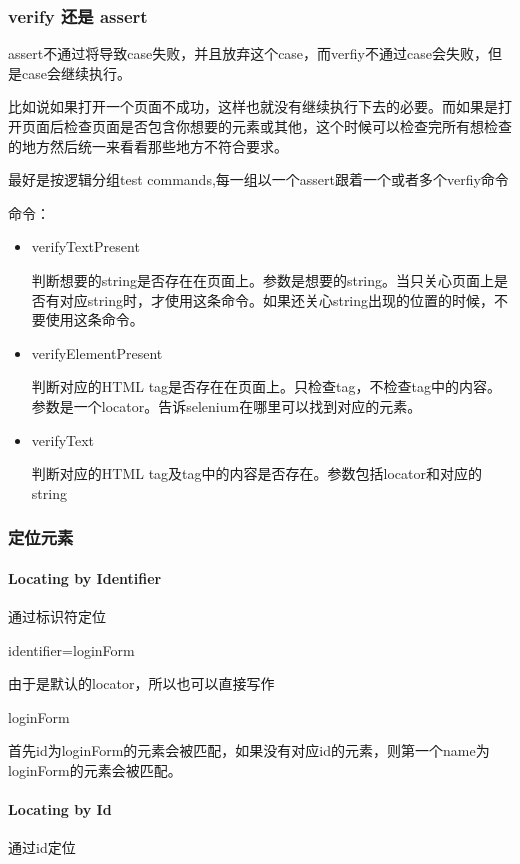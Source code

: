 \subsubsection{verify 还是 assert}
assert不通过将导致case失败，并且放弃这个case，而verfiy不通过case会失败，但是case会继续执行。

比如说如果打开一个页面不成功，这样也就没有继续执行下去的必要。而如果是打开页面后检查页面是否包含你想要的元素或其他，这个时候可以检查完所有想检查的地方然后统一来看看那些地方不符合要求。

最好是按逻辑分组test commands,每一组以一个assert跟着一个或者多个verfiy命令

命令：
\begin{itemize}
\item verifyTextPresent

判断想要的string是否存在在页面上。参数是想要的string。当只关心页面上是否有对应string时，才使用这条命令。如果还关心string出现的位置的时候，不要使用这条命令。

\item verifyElementPresent

判断对应的HTML tag是否存在在页面上。只检查tag，不检查tag中的内容。参数是一个locator。告诉selenium在哪里可以找到对应的元素。

\item verifyText

判断对应的HTML tag及tag中的内容是否存在。参数包括locator和对应的string
\end{itemize}

\subsubsection{定位元素}

\paragraph{Locating by Identifier} 通过标识符定位

identifier=loginForm

由于是默认的locator，所以也可以直接写作

loginForm

首先id为loginForm的元素会被匹配，如果没有对应id的元素，则第一个name为loginForm的元素会被匹配。

\paragraph{Locating by Id} 通过id定位

